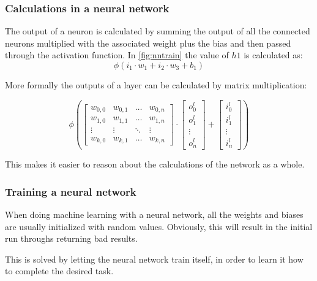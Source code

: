 \subsubsection{Calculations in a neural network}\label{sec:calculationsNN}

The output of a neuron is calculated by summing the output of all the connected neurons multiplied with the associated weight plus the bias and then passed through the activation function.
In \autoref{fig:nntrain} the value of $h1 $ is calculated as:
$$\phi(i_1 \cdot w_1 + i_2 \cdot w_3 + b_1)$$


More formally the outputs of a layer can be calculated by matrix multiplication:

$$
\phi\left(
\begin{bmatrix}
w_{0,0} & w_{0,1} & \dots  & w_{0,n} \\
w_{1,0} & w_{1,1} & \dots  & w_{1,n} \\
\vdots & \vdots & \ddots & \vdots \\
w_{k,0} & w_{k,1} & \dots  & w_{k,n}
\end{bmatrix}
\cdot
\begin{bmatrix}
o^l_0\\
o^l_1\\
\vdots \\
o^l_n
\end{bmatrix}
+
\begin{bmatrix}
i^l_0\\
i^l_1\\
\vdots \\
i^l_n
\end{bmatrix}
\right)
$$

This makes it easier to reason about the calculations of the network as a whole.

\subsubsection{Training a neural network}\label{training-a-neural-network}
When doing machine learning with a neural network, all the weights and biases are usually initialized with random values.
Obviously, this will result in the initial run throughs returning bad results.

This is solved by letting the neural network train itself, in order to learn it how to complete the desired task.

